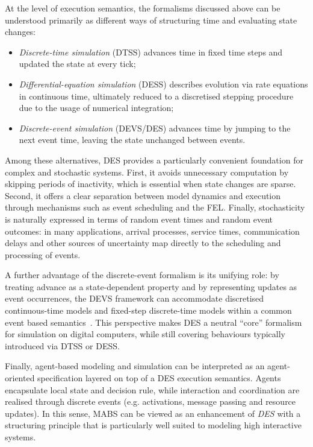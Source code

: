 At the level of execution semantics, the formalisms discussed above can be
understood primarily as different ways of structuring time and evaluating state
changes:
\begin{itemize}
	\item \emph{Discrete-time simulation} (DTSS) advances time in fixed
	      time steps and updated the state at every tick;
	\item \emph{Differential-equation simulation} (DESS) describes
	      evolution via rate equations in continuous time, ultimately
	      reduced to a discretised stepping procedure due to the usage of
	      numerical integration;
	\item \emph{Discrete-event simulation} (DEVS/DES) advances time by
	      jumping to the next event time, leaving the state unchanged
	      between events.
\end{itemize}

Among these alternatives, \ac{DES} provides a particularly convenient
foundation for complex and stochastic systems. First, it avoids unnecessary
computation by skipping periods of inactivity, which is essential when state
changes are sparse. Second, it offers a clear separation between model dynamics
and execution through mechanisms such as event scheduling and the \ac{FEL}.
Finally, stochasticity is naturally expressed in terms of random event times
and random event outcomes: in many applications, arrival processes, service
times, communication delays and other sources of uncertainty map directly to
the scheduling and processing of events.

A further advantage of the discrete-event formalism is its unifying role: by
treating advance as a state-dependent property and by representing updates as
event occurrences, the DEVS framework can accommodate discretised
continuous-time models and fixed-step discrete-time models within a common
event based semantics~\cite{Zeigler:2000}. This perspective makes DES a neutral
``core'' formalism for simulation on digital computers, while still covering
behaviours typically introduced via DTSS or DESS.

Finally, agent-based modeling and simulation can be interpreted as an
agent-oriented specification layered on top of a DES execution semantics.
Agents encapsulate local state and decision rule, while interaction and
coordination are realised through discrete events (e.g. activations, message
passing and resource updates). In this sense, \ac{MABS} can be viewed as an
enhancement of \emph{DES} with a structuring principle that is particularly well
suited to modeling high interactive systems.

